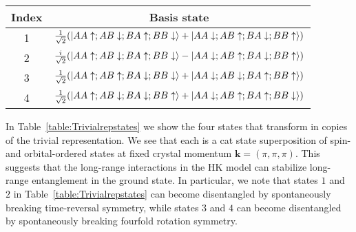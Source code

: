 \documentclass[prb,aps,amssymb,twocolumn,notitlepage]{revtex4-2}
\begin{document}
\begin{table*}[ht]
\centering %
\renewcommand*{\arraystretch}{1}
\begin{tabular}{c c c} %
\hline\hline %
Index & \multicolumn{2}{c}{Basis state} \\[0.5ex]
\hline %
\rule{0pt}{1\normalbaselineskip}
1&\multicolumn{2}{c}{$\tfrac{1}{\sqrt{2}}(\ket{AA\uparrow;AB\downarrow;BA\uparrow;BB\downarrow}+\ket{AA\downarrow;AB\uparrow;BA\downarrow;BB\uparrow})$}\\[2ex]
2&\multicolumn{2}{c}{$\tfrac{i}{\sqrt{2}}(\ket{AA\uparrow;AB\downarrow;BA\uparrow;BB\downarrow}-\ket{AA\downarrow;AB\uparrow;BA\downarrow;BB\uparrow})$}\\[2ex]
3&\multicolumn{2}{c}{$\tfrac{1}{\sqrt{2}}(\ket{AA\uparrow;AB\uparrow;BA\downarrow;BB\downarrow}+\ket{AA\downarrow;AB\downarrow;BA\uparrow;BB\uparrow})$}\\[2ex]
4&\multicolumn{2}{c}{$\tfrac{1}{\sqrt{2}}(\ket{AA\uparrow;AB\downarrow;BA\downarrow;BB\uparrow}+\ket{AA\downarrow;AB\uparrow;BA\uparrow;BB\downarrow})$}\\[1ex]
\hline %
\end{tabular}
\caption{The states which transform under the four copies of the trivial representation in the ground state subspace of $H^0_{135}+H^1_{HK}$ in space group $P4_2/mbc1^\prime$ (\# 135) at the $A$-point. 
The first two states can become disentangled upon breaking time-reversal symmetry, whereas to disentangle the third and fourth states requires breaking one of the spatial symmetries.}
\label{table:Trivialrepstates} %
\end{table*}

In Table~\ref{table:Trivialrepstates} we show the four states that transform in copies of the trivial representation. 
We see that each is a cat state superposition of spin- and orbital-ordered states at fixed crystal momentum $\mathbf{k}=(\pi,\pi,\pi)$. 
This suggests that the long-range interactions in the HK model can stabilize long-range entanglement in the ground state. 
In particular, we note that states $1$ and $2$ in Table~\ref{table:Trivialrepstates} can become disentangled by spontaneously breaking time-reversal symmetry, while states $3$ and $4$ can become disentangled by spontaneously breaking fourfold rotation symmetry. 
\end{document}
